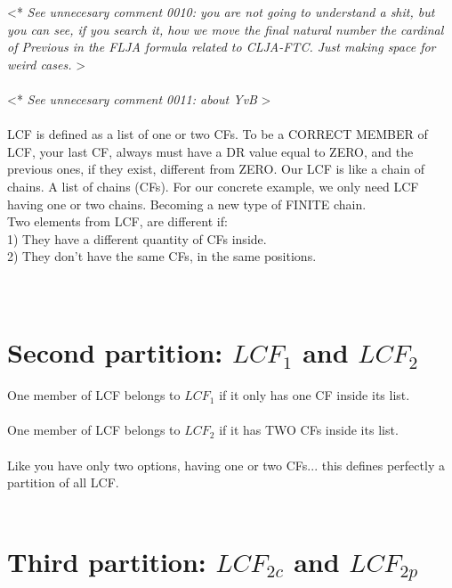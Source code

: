 		\noindent
		\textless ** \textit{See unnecesary comment 0010: you are not going to understand a shit, but you can see, if you search it, how we move the final natural number the cardinal of Previous in the FLJA formula related to CLJA-FTC. Just making space for weird cases.} \textgreater
		\\\\
		
		\noindent
		\textless ** \textit{See unnecesary comment 0011: about YvB} \textgreater
		\\\\
		
		\noindent
		LCF is defined as a list of one or two CFs. To be a CORRECT MEMBER of LCF, your last CF, always must have a DR value equal to ZERO, and the previous ones, if they exist, different from ZERO. Our LCF is like a chain of chains. A list of chains (CFs). For our concrete example, we only need LCF having one or two chains. Becoming a new type of FINITE chain.
		\\
		
		\noindent
		Two elements from LCF, are different if:\\
		1) They have a different quantity of CFs inside.\\
		2) They don't have the same CFs, in the same positions.\\
		\\\\	
	
	\section{Second partition: $LCF_{1}$ and $LCF_{2}$ }
		
		\noindent
		One member of LCF belongs to $LCF_{1}$ if it only has one CF inside its list.
		\\\\
		
		\noindent
		One member of LCF belongs to $LCF_{2}$ if it has TWO CFs inside its list.
		\\\\
		
		\noindent
		Like you have only two options, having one or two CFs... this defines perfectly a partition of all LCF.
		\\\\
		
	
	\section{Third partition: $LCF_{2c}$ and $LCF_{2p}$ }
		

